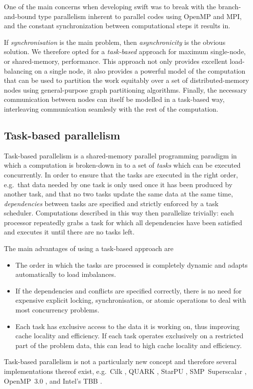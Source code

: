\documentclass{sig-alternate-05-2015}
\newcommand{\swift}{{\sc swift}\xspace}
\begin{document}
One of the main concerns when developing \swift was to break
with the branch-and-bound type parallelism inherent to parallel
codes using OpenMP and MPI, and the constant synchronization
between computational steps it results in.

If {\em synchronisation} is the main problem, then {\em asynchronicity}
is the obvious solution.
We therefore opted for a {\em task-based} approach for maximum
single-node, or shared-memory, performance.
This approach not only provides excellent load-balancing on a single
node, it also provides a powerful model of the computation that
can be used to partition the work equitably over a set of
distributed-memory nodes using general-purpose graph partitioning
algorithms.
Finally, the necessary communication between nodes can itself be
modelled in a task-based way, interleaving communication seamlesly
with the rest of the computation.

\subsection{Task-based parallelism}

Task-based parallelism is a shared-memory parallel programming
paradigm in which a computation is broken-down in to a set of
{\em tasks} which can be executed  concurrently.
In order to ensure that the tasks are executed in the right
order, e.g.~that data needed by one task is only used once it
has been produced by another task, and that no two tasks
update the same data at the same time, {\em dependencies} between
tasks are specified and strictly enforced by a task scheduler.
Computations described in this way then parallelize trivially:
each processor repeatedly grabs a task for which all dependencies
have been satisfied and executes it until there are no tasks left.

The main advantages of using a task-based approach are
%
\begin{itemize}
    \item The order in which the tasks are processed is completely
        dynamic and adapts automatically to load imbalances.
    \item If the dependencies and conflicts are specified correctly,
        there is no need for expensive explicit locking, synchronisation,
        or atomic operations to deal with most concurrency problems.
    \item Each task has exclusive access to the data it is working on,
        thus improving cache locality and efficiency.
        If each task operates exclusively on a restricted part of the
        problem data, this can lead to high cache locality and efficiency.
\end{itemize}
%
Task-based parallelism is not a particularly new concept and therefore
several implementations thereof exist, e.g.~Cilk \cite{ref:Blumofe1995},
QUARK \cite{ref:QUARK}, StarPU \cite{ref:Augonnet2011},
SMP~Superscalar \cite{ref:SMPSuperscalar}, OpenMP~3.0 \cite{ref:Duran2009},
and Intel's TBB \cite{ref:Reinders2007}.
\end{document}

